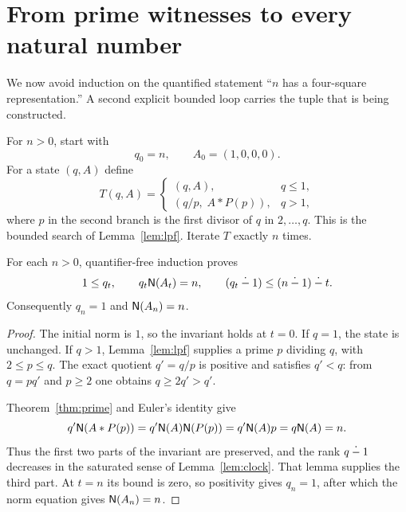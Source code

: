 \section{From prime witnesses to every natural number}
\label{sec:assembly}

We now avoid induction on the quantified statement ``$n$ has a
four-square representation.'' A second explicit bounded loop carries
the tuple that is being constructed.

For $n>0$, start with
\[
 q_0=n,\qquad A_0=(1,0,0,0).
\]
For a state $(q,A)$ define
\begin{equation}
\label{eq:factorstep}
 T(q,A)=
 \begin{cases}
 (q,A),&q\le1,\\
 (q/p,\;A*P(p)),&q>1,
 \end{cases}
\end{equation}
where $p$ in the second branch is the first divisor of $q$ in
$2,\ldots,q$. This is the bounded search of Lemma~\ref{lem:lpf}.
Iterate $T$ exactly $n$ times.

\begin{proposition}
\label{prop:factor}
For each $n>0$, quantifier-free induction proves
\begin{equation}
\label{eq:factorinvariant}
 1\le q_t,\qquad q_t\mathsf N(A_t)=n,\qquad
 (q_t\mathbin{\dot{-}}1)\le(n\mathbin{\dot{-}}1)\mathbin{\dot{-}} t.
\end{equation}
Consequently $q_n=1$ and $\mathsf N(A_n)=n$.
\end{proposition}

\begin{proof}
The initial norm is $1$, so the invariant holds at $t=0$.
If $q=1$, the state is unchanged. If $q>1$, Lemma~\ref{lem:lpf}
supplies a prime $p$ dividing $q$, with $2\le p\le q$.
The exact quotient $q'=q/p$ is positive and satisfies $q'<q$:
from $q=pq'$ and $p\ge2$ one obtains $q\ge2q'>q'$.

Theorem~\ref{thm:prime} and Euler's identity give
\[
 q'\mathsf N(A*P(p))
 =q'\mathsf N(A)\mathsf N(P(p))
 =q'\mathsf N(A)p
 =q\mathsf N(A)=n.
\]
Thus the first two parts of the invariant are preserved, and the rank
$q\mathbin{\dot{-}}1$ decreases in the saturated sense of Lemma~\ref{lem:clock}.
That lemma supplies the third part. At $t=n$ its bound is zero,
so positivity gives $q_n=1$, after which the norm equation gives
$\mathsf N(A_n)=n$.
\end{proof}

